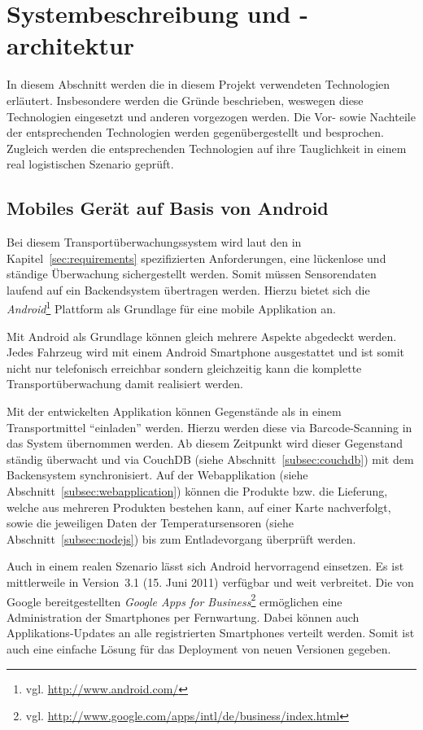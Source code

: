 \section{Systembeschreibung und -architektur}
\label{sec:system}

In diesem Abschnitt werden die in diesem Projekt verwendeten Technologien
	erläutert. Insbesondere werden die Gründe beschrieben, weswegen diese
	Technologien eingesetzt und anderen vorgezogen werden. Die Vor- sowie
	Nachteile der entsprechenden Technologien werden gegenübergestellt und
	besprochen. Zugleich werden die entsprechenden Technologien auf ihre
	Tauglichkeit in einem real logistischen Szenario geprüft.

\subsection{Mobiles Gerät auf Basis von Android}

Bei diesem Transportüberwachungssystem wird laut den in
	Kapitel~\ref{sec:requirements} spezifizierten Anforderungen, eine lückenlose
	und ständige Überwachung sichergestellt werden. Somit müssen Sensorendaten
	laufend auf ein Backendsystem übertragen werden. Hierzu bietet sich
	die \emph{Android}\footnote{vgl. \url{http://www.android.com/}} Plattform
	als Grundlage für eine mobile Applikation an.
	
Mit Android als Grundlage können gleich mehrere Aspekte abgedeckt werden. Jedes
	Fahrzeug wird mit einem Android Smartphone ausgestattet und ist somit nicht
	nur telefonisch erreichbar sondern gleichzeitig kann die komplette
	Transportüberwachung damit realisiert werden.
	
Mit der entwickelten Applikation können Gegenstände als in einem Transportmittel
	``einladen'' werden. Hierzu werden diese via Barcode-Scanning in das System
	übernommen werden. Ab diesem Zeitpunkt wird dieser
	Gegenstand ständig überwacht und via CouchDB (siehe Abschnitt~\ref{subsec:couchdb})
	mit dem Backensystem synchronisiert. Auf der Webapplikation (siehe
	Abschnitt~\ref{subsec:webapplication}) können die Produkte bzw. die Lieferung,
	welche aus mehreren Produkten bestehen kann, auf einer Karte
	nachverfolgt, sowie die jeweiligen Daten der Temperatursensoren
	(siehe Abschnitt~\ref{subsec:nodejs}) bis zum Entladevorgang überprüft werden.
		
Auch in einem realen Szenario lässt sich Android hervorragend einsetzen. Es ist
	mittlerweile in Version~3.1 (15. Juni 2011) verfügbar und weit verbreitet.
	Die von Google bereitgestellten \emph{Google Apps for Business}\footnote{vgl.
	\url{http://www.google.com/apps/intl/de/business/index.html}} ermöglichen eine
	Administration der Smartphones per Fernwartung. Dabei können auch
	Applikations-Updates an alle registrierten Smartphones verteilt werden.
	Somit ist auch eine einfache Lösung für das Deployment von neuen Versionen
	gegeben.
	

